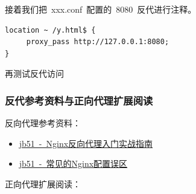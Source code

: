 \documentclass[12pt, a4paper]{article} %
\renewcommand{\figurename}{图} %
\begin{document}
\begin{CJK*}{UTF8}{gbsn}
接着我们把~xxx.conf~配置的~8080~反代进行注释。
\begin{lstlisting}
location ~ /y.html$ {
     proxy_pass http://127.0.0.1:8080;
}
\end{lstlisting}

再测试反代访问
\renewcommand{\figurename}{图} %
\begin{figure}[htbp]
\centering
{}
\centering
\end{figure}

\subsubsection{反代参考资料与正向代理扩展阅读}

反向代理参考资料：

\begin{itemize}
    \item \href{ https://www.jb51.net/article/220092.htm}{jb51~-~Nginx反向代理入门实战指南}
    \item \href{https://www.jb51.net/article/47722.htm}{jb51~-~常见的Nginx配置误区}
\end{itemize}

正向代理扩展阅读：


\end{CJK*}
\end{document}
